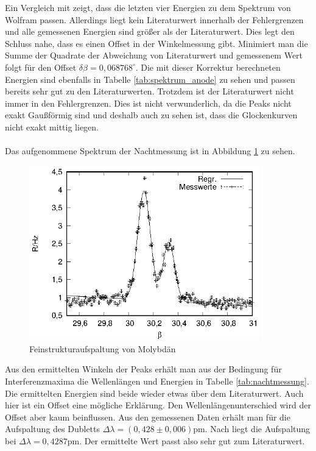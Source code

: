 Ein Vergleich mit \cite{booklet} zeigt, dass die letzten vier Energien zu dem Spektrum von Wolfram passen. Allerdings liegt kein Literaturwert innerhalb der Fehlergrenzen und alle gemessenen Energien sind größer als der Literaturwert. Dies legt den Schluss nahe, dass es einen Offset in der Winkelmessung gibt. Minimiert man die Summe der Quadrate der Abweichung von Literaturwert und gemessenem Wert folgt für den Offset $\delta \beta=0,068768^\circ$. Die mit dieser Korrektur berechneten Energien sind ebenfalls in Tabelle \ref{tab:spektrum_anode} zu sehen und passen bereits sehr gut zu den Literaturwerten. Trotzdem ist der Literaturwert nicht immer in den Fehlergrenzen. Dies ist nicht verwunderlich, da die Peaks nicht exakt Gaußförmig sind und deshalb auch zu sehen ist, dass die Glockenkurven nicht exakt mittig liegen.
\\ \\
Das aufgenommene Spektrum der Nachtmessung ist in Abbildung \ref{fig:nachtmessung} zu sehen.

\begin{figure}[h]
  \centering
  \includegraphics[width=10cm]{data/Bragg/nachtmessung.eps}
  \caption{Feinstrukturaufspaltung von Molybdän}
  \label{fig:nachtmessung}
\end{figure}

Aus den ermittelten Winkeln der Peaks erhält man aus der Bedingung für Interferenzmaxima die Wellenlängen und Energien in Tabelle \ref{tab:nachtmessung}. Die ermittelten Energien sind beide wieder etwas über dem Literaturwert. Auch hier ist ein Offset eine mögliche Erklärung. Den Wellenlängenunterschied wird der Offset aber kaum beinflussen. Aus den gemessenen Daten erhält man für die Aufspaltung des Dubletts $\Delta \lambda=(0,428 \pm 0,006)$pm. Nach \cite{booklet} liegt die Aufspaltung bei $\Delta \lambda= 0,4287$pm. Der ermittelte Wert passt also sehr gut zum Literaturwert.

